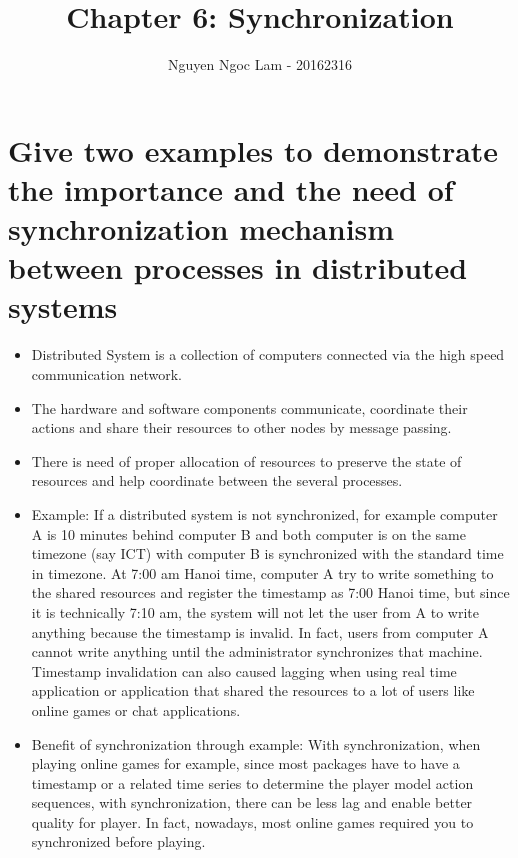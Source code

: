\documentclass[11pt,a4paper]{article}
\title{Chapter 6: Synchronization}
\date{\displaydate{date}}
\author{Nguyen Ngoc Lam - 20162316}
\begin{document}
\maketitle
\newpage
{}
\tableofcontents
\newpage

\section{Give two examples to demonstrate the importance and the need of synchronization mechanism between processes in distributed systems}
\begin{itemize}
	\item Distributed System is a collection of computers connected via the high speed communication network.
	\item The hardware and software components communicate, coordinate their actions and share their resources to other nodes by message passing.
	\item There is need of proper allocation of resources to preserve the state of resources and help coordinate between the several processes.
	\item Example: If a distributed system is not synchronized, for example computer A is 10 minutes behind computer B and both computer is on the same timezone (say ICT) with computer B is synchronized with the standard time in timezone. At 7:00 am Hanoi time, computer A try to write something to the shared resources and register the timestamp as 7:00 Hanoi time, but since it is technically 7:10 am, the system will not let the user from A to write anything because the timestamp is invalid. In fact, users from computer A cannot write anything until the administrator synchronizes that machine. Timestamp invalidation can also caused lagging when using real time application or application that shared the resources to a lot of users like online games or chat applications.
	\item Benefit of synchronization through example: With synchronization, when playing online games for example, since most packages have to have a timestamp or a related time series to determine the player model action sequences, with synchronization, there can be less lag and enable better quality for player. In fact, nowadays, most online games required you to synchronized before playing. 
\end{itemize}
\end{document}
